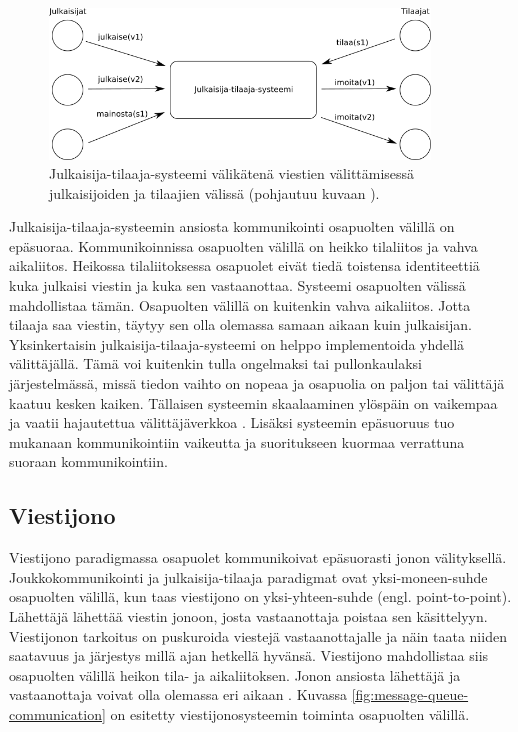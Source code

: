 \begin{figure}[ht!]
	\includegraphics[width=0.9\textwidth]{pictures/publish-subscribe.png}
	\caption{Julkaisija-tilaaja-systeemi välikätenä viestien välittämisessä julkaisijoiden ja tilaajien välissä (pohjautuu kuvaan \mbox{\cite[s.~246]{distributed-systems-concepts-and-design}}).}
	\label{fig:publish-subscribe-communication}
\end{figure}

Julkaisija-tilaaja-systeemin ansiosta kommunikointi osapuolten välillä on epäsuoraa. Kommunikoinnissa osapuolten välillä on heikko tilaliitos ja vahva aikaliitos. Heikossa tilaliitoksessa osapuolet eivät tiedä toistensa identiteettiä kuka julkaisi viestin ja kuka sen vastaanottaa. Systeemi osapuolten välissä mahdollistaa tämän. Osapuolten välillä on kuitenkin vahva aikaliitos. Jotta tilaaja saa viestin, täytyy sen olla olemassa samaan aikaan kuin julkaisijan. Yksinkertaisin julkaisija-tilaaja-systeemi on helppo implementoida yhdellä välittäjällä. Tämä voi kuitenkin tulla ongelmaksi tai pullonkaulaksi järjestelmässä, missä tiedon vaihto on nopeaa ja osapuolia on paljon tai välittäjä kaatuu kesken kaiken. Tällaisen systeemin skaalaaminen ylöspäin on vaikempaa ja vaatii hajautettua välittäjäverkkoa \cite[s.~248--249]{distributed-systems-concepts-and-design}. Lisäksi systeemin epäsuoruus tuo mukanaan kommunikointiin vaikeutta ja suoritukseen kuormaa verrattuna suoraan kommunikointiin.


\subsection{Viestijono}
Viestijono paradigmassa osapuolet kommunikoivat epäsuorasti jonon välityksellä. Joukkokommunikointi ja julkaisija-tilaaja paradigmat ovat yksi-moneen-suhde osapuolten välillä, kun taas viestijono on yksi-yhteen-suhde (engl. point-to-point). Lähettäjä lähettää viestin jonoon, josta vastaanottaja poistaa sen käsittelyyn. Viestijonon tarkoitus on puskuroida viestejä vastaanottajalle ja näin taata niiden saatavuus ja järjestys millä ajan hetkellä hyvänsä. Viestijono mahdollistaa siis osapuolten välillä heikon tila- ja aikaliitoksen. Jonon ansiosta lähettäjä ja vastaanottaja voivat olla olemassa eri aikaan \cite[s.~254]{distributed-systems-concepts-and-design}. Kuvassa \ref{fig:message-queue-communication} on esitetty viestijonosysteemin toiminta osapuolten välillä.

